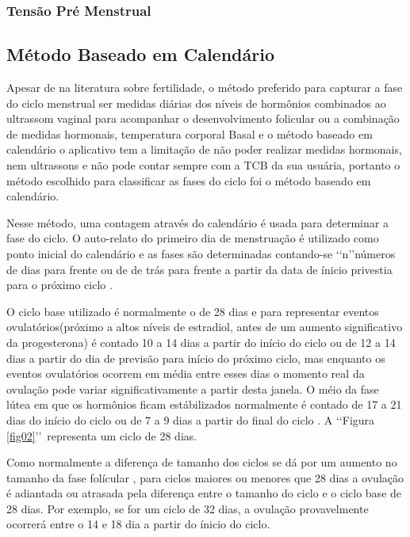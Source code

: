 \subsubsection{Tensão Pré Menstrual}

\subsection{Método Baseado em Calendário}

Apesar de na literatura sobre fertilidade, o método preferido para capturar a fase do ciclo menstrual ser medidas diárias dos níveis de hormônios combinados ao ultrassom vaginal para acompanhar o desenvolvimento folicular \cite{ecochard2001} ou a combinação de medidas hormonais, temperatura corporal Basal e o método baseado em calendário \cite{becker2005} o aplicativo tem a limitação de não poder realizar medidas hormonais, nem ultrassons e não pode contar sempre com a TCB da sua usuária, portanto o método escolhido para classificar as fases do ciclo foi o método baseado em calendário.

Nesse método, uma contagem através do calendário é usada para determinar a fase do ciclo. O auto-relato do primeiro dia de menstruação é utilizado como ponto inicial do calendário e as fases são determinadas contando-se \lq \lq n\rq \rq  números de dias para frente ou de de trás para frente a partir da data de ínicio privestia para o próximo ciclo \cite{wideman2013}.

O ciclo base utilizado é normalmente o de 28 dias e para representar eventos ovulatórios(próximo a altos níveis de estradiol, antes de um aumento significativo da progesterona) é contado 10 a 14 dias a partir do início do ciclo ou de 12 a 14 dias a partir do dia de previsão para início do próximo ciclo, mas enquanto os eventos ovulatórios ocorrem em média entre esses dias o momento real da ovulação pode variar significativamente a partir desta janela. O méio da fase lútea em que os hormônios ficam estábilizados normalmente é contado de 17 a 21 dias do início do ciclo ou de 7 a 9 dias a partir do final do ciclo \cite{wideman2013}. A \lq\lq Figura \ref{fig02}\rq\rq\ representa um ciclo de 28 dias.

Como normalmente a diferença de tamanho dos ciclos se dá por um aumento no tamanho da fase folícular \cite{lenton1984a}, para ciclos maiores ou menores que 28 dias a ovulação é adiantada ou atrasada pela diferença entre o tamanho do ciclo e o ciclo base de 28 dias. Por exemplo, se for um ciclo de 32 dias, a ovulação provavelmente ocorrerá entre o 14 e 18 dia a partir do ínicio do ciclo.

